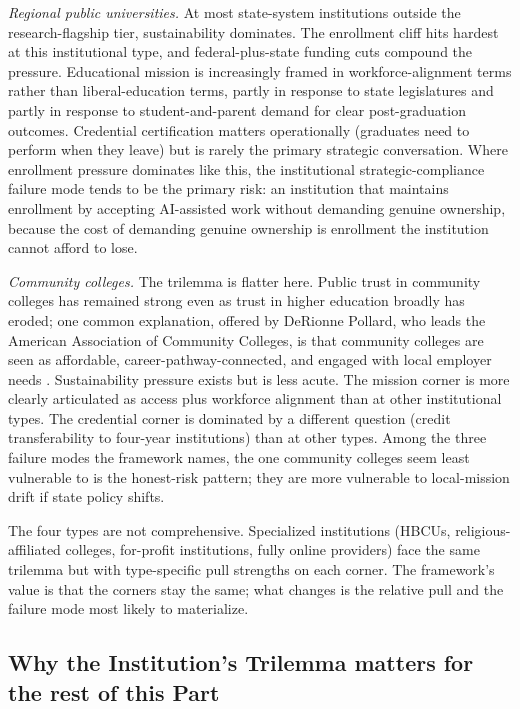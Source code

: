 \documentclass{SIAMbook2023}
\begin{document}
\textit{Regional public universities.} At most state-system institutions outside the research-flagship tier, sustainability dominates. The enrollment cliff hits hardest at this institutional type, and federal-plus-state funding cuts compound the pressure. Educational mission is increasingly framed in workforce-alignment terms rather than liberal-education terms, partly in response to state legislatures and partly in response to student-and-parent demand for clear post-graduation outcomes. Credential certification matters operationally (graduates need to perform when they leave) but is rarely the primary strategic conversation. Where enrollment pressure dominates like this, the institutional strategic-compliance failure mode tends to be the primary risk: an institution that maintains enrollment by accepting AI-assisted work without demanding genuine ownership, because the cost of demanding genuine ownership is enrollment the institution cannot afford to lose.

\textit{Community colleges.} The trilemma is flatter here. Public trust in community colleges has remained strong even as trust in higher education broadly has eroded; one common explanation, offered by DeRionne Pollard, who leads the American Association of Community Colleges, is that community colleges are seen as affordable, career-pathway-connected, and engaged with local employer needs \citep{pollard2026community}. Sustainability pressure exists but is less acute. The mission corner is more clearly articulated as access plus workforce alignment than at other institutional types. The credential corner is dominated by a different question (credit transferability to four-year institutions) than at other types. Among the three failure modes the framework names, the one community colleges seem least vulnerable to is the honest-risk pattern; they are more vulnerable to local-mission drift if state policy shifts.

The four types are not comprehensive. Specialized institutions (HBCUs, religious-affiliated colleges, for-profit institutions, fully online providers) face the same trilemma but with type-specific pull strengths on each corner. The framework's value is that the corners stay the same; what changes is the relative pull and the failure mode most likely to materialize.

\subsection{Why the Institution's Trilemma matters for the rest of this Part}
\label{u:subsec:trilemma-stakes}
\end{document}
